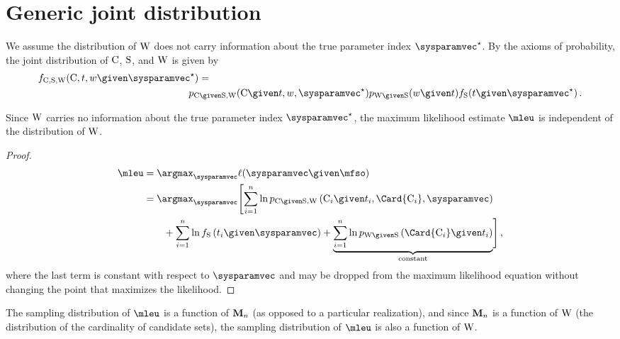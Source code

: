 \documentclass[../main.tex]{subfiles}
\begin{document}
\chapter{Generic joint distribution}
\label{appendix:generalized_general_joint_likelihood_cand}
We assume the distribution of $\mathrm{W}$ does not carry information about the true parameter index $\tparam\sysparamvec$. By the axioms of probability, the joint distribution of $\mathrm{C}$, $\mathrm{S}$, and $\mathrm{W}$ is given by
\begin{equation}
\begin{split}
\pdf_{\rvcand, \sv, \RV{W}}(\cand, t, w \given \tparam\sysparamvec) &=\\ &\!\!\!\!\!\!\pmf_{\rvcand \given \sv, \RV{W}}(\cand \given t, w, \tparam\sysparamvec) \pmf_{\RV{W} \given \sv}(w \given t) \spdf(t \given \tparam\sysparamvec)\,.
\end{split}
\end{equation}

Since $\mathrm{W}$ carries no information about the true parameter index $\tparam\sysparamvec$, the maximum likelihood estimate $\mleu$ is independent of the distribution of $\mathrm{W}$.
\begin{proof}
\begin{equation}
\begin{split}
    \mleu &= \argmax_{\sysparamvec}
        \ell(\sysparamvec \given \mfso)\\
        &= \argmax_{\sysparamvec} \Biggl[ \sum_{i=1}^{n}
        \ln \pmf_{\rvcand \given \sv, \RV{W}}\left(\cand_i \given t_i, \Card{\cand_i}, \sysparamvec\right)\\
        &\qquad+ \sum_{i=1}^{n} \ln \spdf\left(t_i \given \sysparamvec\right) + \underbrace{\sum_{i=1}^{n} \ln \pmf_{\RV{W} \given \sv}\left(\Card{\cand_i} \given t_i \right)}_{\text{constant}}\Biggr]\,,
\end{split}
\end{equation}
where the last term is constant with respect to $\sysparamvec$ and may be dropped from the maximum likelihood equation without changing the point that maximizes the likelihood.
\end{proof}

The sampling distribution of $\mleu$ is a function of $\mathbf{M}_n$ (as opposed to a particular realization), and since $\mathbf{M}_n$ is a function of $\mathrm{W}$ (the distribution of the cardinality of candidate sets), the sampling distribution of $\mleu$ is also a function of $\mathrm{W}$.
\end{document}
